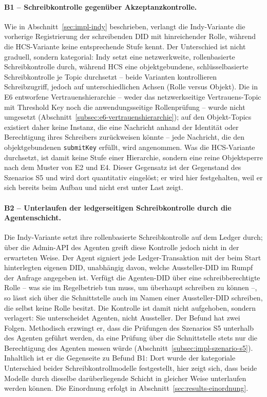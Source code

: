 \paragraph{B1 -- Schreibkontrolle gegenüber Akzeptanzkontrolle.} Wie in Abschnitt~\ref{sec:impl-indy} beschrieben, verlangt die Indy-Variante die vorherige Registrierung der schreibenden DID mit hinreichender Rolle, während die HCS-Variante keine entsprechende Stufe kennt. Der Unterschied ist nicht graduell, sondern kategorial: Indy setzt eine netzwerkweite, rollenbasierte Schreibkontrolle durch, während HCS eine objektgebundene, schlüsselbasierte Schreibkontrolle je Topic durchsetzt -- beide Varianten kontrollieren Schreibzugriff, jedoch auf unterschiedlichen Achsen (Rolle versus Objekt). Die in E6 entworfene Vertrauenshierarchie -- weder das netzwerkseitige Vertrauens-Topic mit Threshold Key noch die anwendungsseitige Rollenprüfung -- wurde nicht umgesetzt (Abschnitt~\ref{subsec:e6-vertrauenshierarchie}); auf den Objekt-Topics existiert daher keine Instanz, die eine Nachricht anhand der Identität oder Berechtigung ihres Schreibers zurückweisen könnte -- jede Nachricht, die den objektgebundenen \texttt{submitKey} erfüllt, wird angenommen. Was die HCS-Variante durchsetzt, ist damit keine Stufe einer Hierarchie, sondern eine reine Objektsperre nach dem Muster von E2 und E4. Dieser Gegensatz ist der Gegenstand des Szenarios S5 und wird dort quantitativ eingelöst; er wird hier festgehalten, weil er sich bereits beim Aufbau und nicht erst unter Last zeigt.

\paragraph{B2 -- Unterlaufen der ledgerseitigen Schreibkontrolle durch die Agentenschicht.} Die Indy-Variante setzt ihre rollenbasierte Schreibkontrolle auf dem Ledger durch; über die Admin-API des Agenten greift diese Kontrolle jedoch nicht in der erwarteten Weise. Der Agent signiert jede Ledger-Transaktion mit der beim Start hinterlegten eigenen DID, unabhängig davon, welche Aussteller-DID im Rumpf der Anfrage angegeben ist. Verfügt die Agenten-DID über eine schreibberechtigte Rolle -- was sie im Regelbetrieb tun muss, um überhaupt schreiben zu können --, so lässt sich über die Schnittstelle auch im Namen einer Aussteller-DID schreiben, die selbst keine Rolle besitzt. Die Kontrolle ist damit nicht aufgehoben, sondern verlagert: Sie unterscheidet Agenten, nicht Aussteller. Der Befund hat zwei Folgen. Methodisch erzwingt er, dass die Prüfungen des Szenarios S5 unterhalb des Agenten geführt werden, da eine Prüfung über die Schnittstelle stets nur die Berechtigung des Agenten messen würde (Abschnitt~\ref{subsec:impl-szenario-s5}). Inhaltlich ist er die Gegenseite zu Befund B1: Dort wurde der kategoriale Unterschied beider Schreibkontrollmodelle festgestellt, hier zeigt sich, dass beide Modelle durch dieselbe darüberliegende Schicht in gleicher Weise unterlaufen werden können. Die Einordnung erfolgt in Abschnitt~\ref{sec:results-einordnung}.




